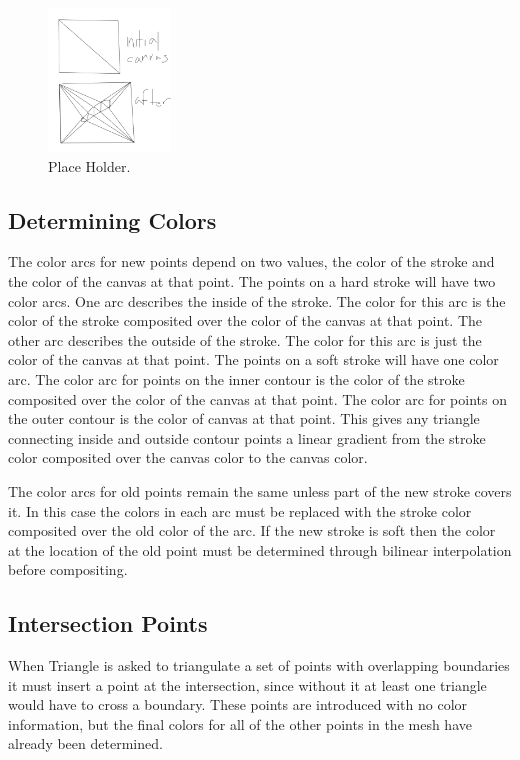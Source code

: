 \documentclass[review]{acmsiggraph}
\begin{document}
\begin{figure}
    \centering
        \includegraphics[height=1.5in]{images/canvastriangulation}
    \caption{Place Holder.}
\end{figure}


\subsection{Determining Colors}
The color arcs for new points depend on two values, the color of the stroke and the color
of the canvas at that point. The points on a hard stroke will have two color arcs. One
arc describes the inside of the stroke. The color for this arc is the color of the stroke
composited over the color of the canvas at that point. The other arc describes the outside
of the stroke. The color for this arc is just the color of the canvas at that point. The
points on a soft stroke will have one color arc. The color arc for points on the inner
contour is the color of the stroke composited over the color of the canvas at that point.
The color arc for points on the outer contour is the color of canvas at that point.
This gives any triangle connecting inside and outside contour points a linear gradient
from the stroke color composited over the canvas color to the canvas color.

The color arcs for old points remain the same unless part of the new stroke covers it.
In this case the colors in each arc must be replaced with the stroke color composited over
the old color of the arc. If the new stroke is soft then the color at the location of
the old point must be determined through bilinear interpolation before compositing.




\subsection{Intersection Points}

When Triangle is asked to triangulate a set of points with overlapping boundaries it must
insert a point at the intersection, since without it at least one triangle would have to
cross a boundary. These points are introduced with no color information, but the final colors for 
all of the other points in the mesh have already been determined.
\end{document}
